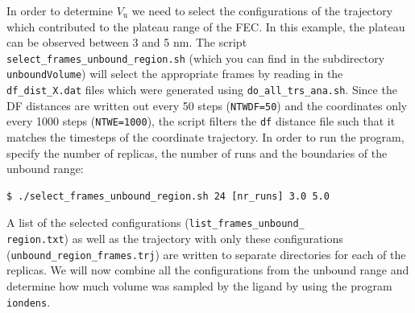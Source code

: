 In order to determine $V_{\text{u}}$ we need to select the configurations of the trajectory which contributed to the plateau range of the FEC. 
In this example, the plateau can be observed between 3 and 5 nm. 
The script \texttt{select\_frames\_unbound\_region.sh} (which you can find in the subdirectory \texttt{unboundVolume}) will select the appropriate frames by reading in the \texttt{df\_dist\_X.dat} files which were generated using \texttt{do\_all\_trs\_ana.sh}.
Since the DF distances are written out every 50 steps (\texttt{NTWDF=50}) and the coordinates only every 1000 steps (\texttt{NTWE=1000}), the script filters the \texttt{df} distance file such that it matches the timesteps of the coordinate trajectory. 
In order to run the program, specify the number of replicas, the number of runs and the boundaries of the unbound range:
\begin{lstlisting}
$ ./select_frames_unbound_region.sh 24 [nr_runs] 3.0 5.0
\end{lstlisting} 
A list of the selected configurations (\texttt{list\_frames\_unbound\_\\region.txt}) as well as the trajectory with only these configurations (\texttt{unbound\_region\_frames.trj}) are written to separate directories for each of the replicas.
We will now combine all the configurations from the unbound range and determine how much volume was sampled by the ligand by using the program \texttt{iondens}.
